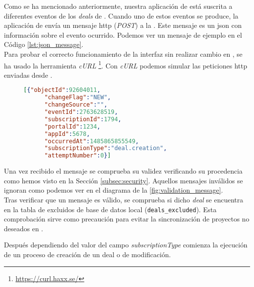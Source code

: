Como se ha mencionado anteriormente, nuestra aplicación de \hs{} está suscrita a diferentes eventos de los \textit{deals} de \hs{}.
Cuando uno de estos eventos se produce, la aplicación de \hs{} envía un mensaje \acrshort{http} (\textit{POST}) a la \iface{}. Este mensaje es un \acrshort{json} con información sobre el evento ocurrido. Podemos ver un mensaje de ejemplo en el Código \ref{lst:json_message}.\\

Para probar el correcto funcionamiento de la interfaz sin realizar cambio en \hs{}, se ha usado la herramienta \textit{cURL} \footnote{\url{https://curl.haxx.se/}}. 
Con \textit{cURL} podemos simular las peticiones \acrshort{http} enviadas desde \hs{}.

\begin{figure}
\begin{lstlisting}[caption={Ejemplo de mensaje recibido por la \iface{}},label={lst:json_message}, language=json]
	[{"objectId":92604011,
	  "changeFlag":"NEW",
	  "changeSource":"",
	  "eventId":2763628519,
	  "subscriptionId":1794,
	  "portalId":1234,
	  "appId":5678,
	  "occurredAt":1485865855549,
	  "subscriptionType":"deal.creation",
	  "attemptNumber":0}]
\end{lstlisting}
\end{figure}
 
Una vez recibido el mensaje se comprueba su validez verificando su procedencia como hemos visto en la Sección \ref{subsec:security}. Aquellos mensajes inválidos se ignoran como podemos ver en el diagrama de la \ref{fig:validation_message}.\\

Tras verificar que un mensaje es válido, se comprueba si dicho \textit{deal} se encuentra en la tabla de excluidos de base de datos local (\texttt{deals\_excluded}). 
Esta comprobación sirve como precaución para evitar la sincronización de proyectos no deseados en \wday{}.

Después dependiendo del valor del campo \textit{subscriptionType} comienza la ejecución de un proceso de creación de un deal o de modificación.

